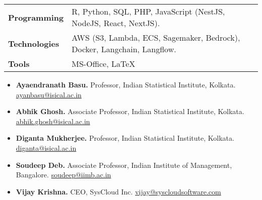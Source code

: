 \documentclass[10pt]{developercv} %
\begin{document}
\vspace{-6pt}

\begin{tabular}{p{3cm}l}
    \textbf{Programming} & R, Python, SQL, PHP, JavaScript (NestJS, NodeJS, React, NextJS).\\
    \textbf{Technologies} & AWS (S3, Lambda, ECS, Sagemaker, Bedrock), Docker, Langchain, Langflow.\\
    \textbf{Tools} & MS-Office, \LaTeX\\
\end{tabular}


\pagebreak
{}
\begin{itemize}[noitemsep]
    \item \textbf{Ayaendranath Basu.} Professor, Indian Statistical Institute, Kolkata. \href{mailto:ayanbasu@isical.ac.in}{ayanbasu@isical.ac.in}
    \item \textbf{Abhik Ghosh.}  Associate Professor, Indian Statistical Institute, Kolkata. \href{mailto:abhik.ghosh@isical.ac.in}{abhik.ghosh@isical.ac.in}
    \item \textbf{Diganta Mukherjee.} Professor, Indian Statistical Institute, Kolkata. \href{mailto:diganta@isical.ac.in}{diganta@isical.ac.in}
    \item \textbf{Soudeep Deb.} Associate Professor, Indian Institute of Management, Bangalore. \href{mailto:soudeep@iimb.ac.in}{soudeep@iimb.ac.in}
    \item \textbf{Vijay Krishna.} CEO, SysCloud Inc. \href{mailto:vijay@syscloudsoftware.com}{vijay@syscloudsoftware.com}
\end{itemize}




\end{document}
